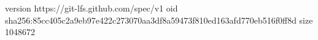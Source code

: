 version https://git-lfs.github.com/spec/v1
oid sha256:85cc405c2a9eb97e422c273070aa3df8a59473f810ed163afd770eb516f0ff8d
size 1048672
